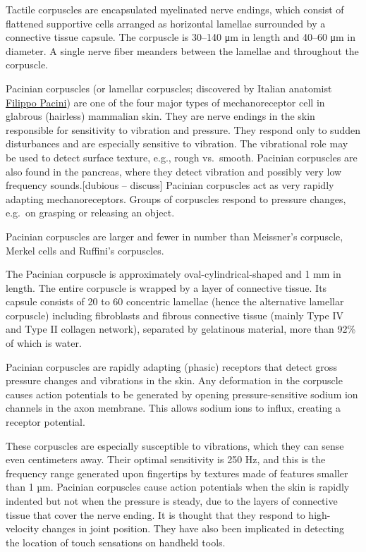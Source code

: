 Tactile corpuscles are encapsulated myelinated nerve endings, which consist of flattened supportive cells arranged as horizontal lamellae surrounded by a connective tissue capsule. The corpuscle is 30--140 μm in length and 40--60 μm in diameter. A single nerve fiber meanders between the lamellae and throughout the corpuscle.

Pacinian corpuscles (or lamellar corpuscles; discovered by Italian anatomist \href{https://en.wikipedia.org/wiki/Filippo_Pacini}{Filippo Pacini}) are one of the four major types of mechanoreceptor cell in glabrous (hairless) mammalian skin. They are nerve endings in the skin responsible for sensitivity to vibration and pressure. They respond only to sudden disturbances and are especially sensitive to vibration. The vibrational role may be used to detect surface texture, e.g., rough vs.~smooth. Pacinian corpuscles are also found in the pancreas, where they detect vibration and possibly very low frequency sounds.{[}dubious -- discuss{]} Pacinian corpuscles act as very rapidly adapting mechanoreceptors. Groups of corpuscles respond to pressure changes, e.g.~on grasping or releasing an object.

Pacinian corpuscles are larger and fewer in number than Meissner's corpuscle, Merkel cells and Ruffini's corpuscles.

The Pacinian corpuscle is approximately oval-cylindrical-shaped and 1 mm in length. The entire corpuscle is wrapped by a layer of connective tissue. Its capsule consists of 20 to 60 concentric lamellae (hence the alternative lamellar corpuscle) including fibroblasts and fibrous connective tissue (mainly Type IV and Type II collagen network), separated by gelatinous material, more than 92\% of which is water.

Pacinian corpuscles are rapidly adapting (phasic) receptors that detect gross pressure changes and vibrations in the skin. Any deformation in the corpuscle causes action potentials to be generated by opening pressure-sensitive sodium ion channels in the axon membrane. This allows sodium ions to influx, creating a receptor potential.

These corpuscles are especially susceptible to vibrations, which they can sense even centimeters away. Their optimal sensitivity is 250 Hz, and this is the frequency range generated upon fingertips by textures made of features smaller than 1 µm. Pacinian corpuscles cause action potentials when the skin is rapidly indented but not when the pressure is steady, due to the layers of connective tissue that cover the nerve ending. It is thought that they respond to high-velocity changes in joint position. They have also been implicated in detecting the location of touch sensations on handheld tools.

